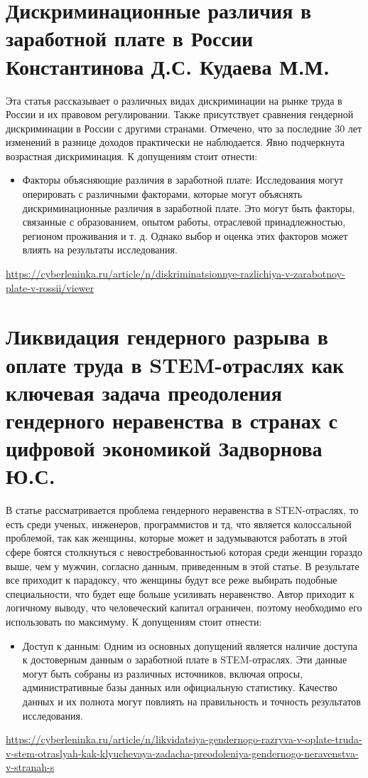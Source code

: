\documentclass[a4paper,14pt]{article}
\begin{document}
\section{Дискриминационные различия в заработной плате в России Константинова Д.С. Кудаева М.М.}
Эта статья рассказывает о различных видах дискриминации на рынке труда в России и их правовом регулировании. Также присутствует сравнения гендерной дискриминации в России с другими странами. Отмечено, что за последние 30 лет изменений в разнице доходов практически не наблюдается. Явно подчеркнута возрастная дискриминация. К допущениям стоит отнести:
\begin{itemize}
    \item Факторы объясняющие различия в заработной плате: Исследования могут оперировать с различными факторами, которые могут объяснять дискриминационные различия в заработной плате. Это могут быть факторы, связанные с образованием, опытом работы, отраслевой принадлежностью, регионом проживания и т. д. Однако выбор и оценка этих факторов может влиять на результаты исследования.
\end{itemize}
\url{https://cyberleninka.ru/article/n/diskriminatsionnye-razlichiya-v-zarabotnoy-plate-v-rossii/viewer}
\section{Ликвидация гендерного разрыва в оплате труда в STEM-отраслях как ключевая задача преодоления гендерного неравенства в странах с цифровой экономикой Задворнова Ю.С.}
В статье рассматривается проблема гендерного неравенства в STEN-отраслях, то есть среди ученых, инженеров, программистов и тд, что является колоссальной проблемой, так как женщины, которые может и задумываются работать в этой сфере боятся столкнуться с невостребованностью6 которая среди женщин гораздо выше, чем у мужчин, согласно данным, приведенным в этой статье. В результате все приходит к парадоксу, что женщины будут все реже выбирать подобные специальности, что будет еще больше усиливать неравенство. Автор приходит к логичному выводу, что человеческий капитал ограничен, поэтому необходимо его использовать по максимуму.
К допущениям стоит отнести:

\begin{itemize}
    \item Доступ к данным: Одним из основных допущений является наличие доступа к достоверным данным о заработной плате в STEM-отраслях. Эти данные могут быть собраны из различных источников, включая опросы, административные базы данных или официальную статистику. Качество данных и их полнота могут повлиять на правильность и точность результатов исследования.
\end{itemize}
\url{https://cyberleninka.ru/article/n/likvidatsiya-gendernogo-razryva-v-oplate-truda-v-stem-otraslyah-kak-klyuchevaya-zadacha-preodoleniya-gendernogo-neravenstva-v-stranah-s}
\end{document}
